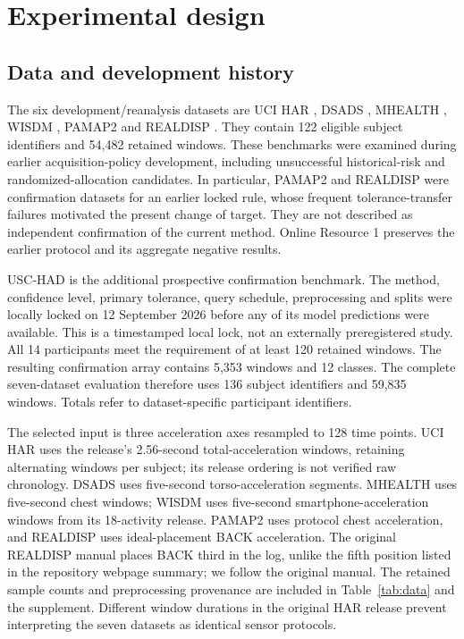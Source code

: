 \documentclass[pdflatex,sn-basic,Numbered,iicol]{sn-jnl}
\begin{document}
\section{Experimental design}
\label{sec:experiments}
\subsection{Data and development history}
The six development/reanalysis datasets are UCI HAR \cite{har}, DSADS \cite{dsads}, MHEALTH \cite{mhealth}, WISDM \cite{wisdm}, PAMAP2 \cite{pamap} and REALDISP \cite{realdisp}. They contain 122 eligible subject identifiers and 54,482 retained windows. These benchmarks were examined during earlier acquisition-policy development, including unsuccessful historical-risk and randomized-allocation candidates. In particular, PAMAP2 and REALDISP were confirmation datasets for an earlier locked rule, whose frequent tolerance-transfer failures motivated the present change of target. They are not described as independent confirmation of the current method. Online Resource 1 preserves the earlier protocol and its aggregate negative results.

USC-HAD \cite{uschad} is the additional prospective confirmation benchmark. The method, confidence level, primary tolerance, query schedule, preprocessing and splits were locally locked on 12 September 2026 before any of its model predictions were available. This is a timestamped local lock, not an externally preregistered study. All 14 participants meet the requirement of at least 120 retained windows. The resulting confirmation array contains 5,353 windows and 12 classes. The complete seven-dataset evaluation therefore uses 136 subject identifiers and 59,835 windows. Totals refer to dataset-specific participant identifiers.

The selected input is three acceleration axes resampled to 128 time points. UCI HAR uses the release's 2.56-second total-acceleration windows, retaining alternating windows per subject; its release ordering is not verified raw chronology. DSADS uses five-second torso-acceleration segments. MHEALTH uses five-second chest windows; WISDM uses five-second smartphone-acceleration windows from its 18-activity release. PAMAP2 uses protocol chest acceleration, and REALDISP uses ideal-placement BACK acceleration. The original REALDISP manual places BACK third in the log, unlike the fifth position listed in the repository webpage summary; we follow the original manual. The retained sample counts and preprocessing provenance are included in Table~\ref{tab:data} and the supplement. Different window durations in the original HAR release prevent interpreting the seven datasets as identical sensor protocols.
\end{document}
